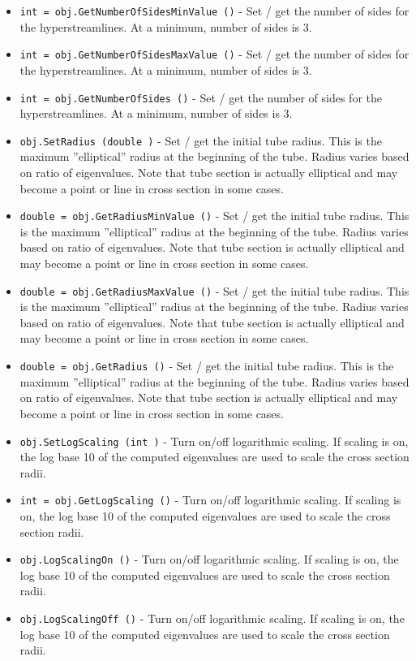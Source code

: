 \begin{itemize}
\item  \verb|int = obj.GetNumberOfSidesMinValue ()| -  Set / get the number of sides for the hyperstreamlines. At a minimum,
 number of sides is 3.

\item  \verb|int = obj.GetNumberOfSidesMaxValue ()| -  Set / get the number of sides for the hyperstreamlines. At a minimum,
 number of sides is 3.

\item  \verb|int = obj.GetNumberOfSides ()| -  Set / get the number of sides for the hyperstreamlines. At a minimum,
 number of sides is 3.

\item  \verb|obj.SetRadius (double )| -  Set / get the initial tube radius. This is the maximum ''elliptical''
 radius at the beginning of the tube. Radius varies based on ratio of
 eigenvalues.  Note that tube section is actually elliptical and may
 become a point or line in cross section in some cases.

\item  \verb|double = obj.GetRadiusMinValue ()| -  Set / get the initial tube radius. This is the maximum ''elliptical''
 radius at the beginning of the tube. Radius varies based on ratio of
 eigenvalues.  Note that tube section is actually elliptical and may
 become a point or line in cross section in some cases.

\item  \verb|double = obj.GetRadiusMaxValue ()| -  Set / get the initial tube radius. This is the maximum ''elliptical''
 radius at the beginning of the tube. Radius varies based on ratio of
 eigenvalues.  Note that tube section is actually elliptical and may
 become a point or line in cross section in some cases.

\item  \verb|double = obj.GetRadius ()| -  Set / get the initial tube radius. This is the maximum ''elliptical''
 radius at the beginning of the tube. Radius varies based on ratio of
 eigenvalues.  Note that tube section is actually elliptical and may
 become a point or line in cross section in some cases.

\item  \verb|obj.SetLogScaling (int )| -  Turn on/off logarithmic scaling. If scaling is on, the log base 10
 of the computed eigenvalues are used to scale the cross section radii.

\item  \verb|int = obj.GetLogScaling ()| -  Turn on/off logarithmic scaling. If scaling is on, the log base 10
 of the computed eigenvalues are used to scale the cross section radii.

\item  \verb|obj.LogScalingOn ()| -  Turn on/off logarithmic scaling. If scaling is on, the log base 10
 of the computed eigenvalues are used to scale the cross section radii.

\item  \verb|obj.LogScalingOff ()| -  Turn on/off logarithmic scaling. If scaling is on, the log base 10
 of the computed eigenvalues are used to scale the cross section radii.

\end{itemize}
